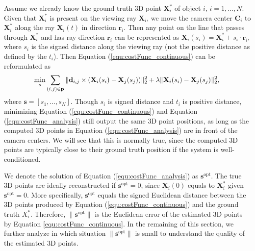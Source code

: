 Assume we already know the ground truth 3D point $\mathbf{{X}}_i^*$ of object $i$, $i=1,\dots,N$. Given that $\mathbf{{X}}_i^*$ is present on the viewing ray $\mathbf{X}_i$, we move the camera center $\mathbf{C}_i$ to $\mathbf{X}_i^*$ along the ray $\mathbf{X}_i(t)$ in direction $\mathbf{r}_i$. Then any point on the line that passes through $\mathbf{X}_i^*$ and has ray direction $\mathbf{r}_i$ can be represented as $\mathbf{X}_i (s_i)= \mathbf{X}_i^* + s_i \cdot \mathbf{r}_i$, where $s_i$ is the signed distance along the viewing ray (not the positive distance as defined by the $t_i$). Then Equation (\ref{equ:costFunc_continuous}) can be reformulated as
\begin{equation}
\label{equ:costFunc_analysis}
\underset{\mathbf{s}} { \text{min} }
\sum_{(i,j)\in{\mathbf{p}}}{\|\mathbf{d}_{i,j}\times(\mathbf{X}_i(s_i)-\mathbf{X}_j(s_j))\|_2^2 + \lambda\|\mathbf{X}_i(s_i)-\mathbf{X}_j(s_j)\|_2^2}, \\
\end{equation}
where $\mathbf{s}=[s_1, \dots, s_N]$. Though $s_i$ is signed distance and $t_i$ is positive distance, minimizing Equation (\ref{equ:costFunc_continuous}) and Equation (\ref{equ:costFunc_analysis}) still output the same 3D point positions, as long as the computed 3D points in Equation (\ref{equ:costFunc_analysis}) are in front of the camera centers. We will see that this is normally true, since the computed 3D points are typically close to their ground truth position if the system is well-conditioned.

We denote the solution of Equation (\ref{equ:costFunc_analysis}) as $\mathbf{s}^\text{opt}$. The true 3D points are ideally reconstructed if $\mathbf{s}^\text{opt}=0$, since $\mathbf{X}_i(0)$ equals to $\mathbf{{X}}_i^*$ given $\mathbf{s}^\text{opt}=0$.
More specifically, $\mathbf{s}^\text{opt}$ equals the signed Euclidean distance between the 3D points produced by Equation (\ref{equ:costFunc_continuous}) and the ground truth $X_i^*$.
Therefore, $\|\mathbf{s}^\text{opt}\|$ is the Euclidean error of the estimated 3D points by Equation \ref{equ:costFunc_continuous}.
In the remaining of this section, we further analyze in which situation $\|\mathbf{s}^\text{opt}\|$ is small to understand the quality of the estimated 3D points. %

